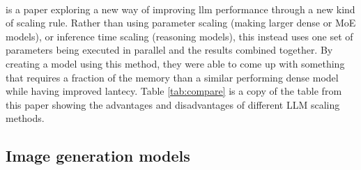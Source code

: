 \paragraph{}\autocite{chen_parallel_2025} is a paper exploring a new way of improving \acrshort{llm} performance through a new kind of scaling rule. Rather than using parameter scaling (making larger dense or MoE models), or inference time scaling (reasoning models), this instead uses one set of parameters being executed in parallel and the results combined together. By creating a model using this method, they were able to come up with something that requires a fraction of the memory than a similar performing dense model while having improved lantecy. Table \ref{tab:compare} is a copy of the table from this paper showing the advantages and disadvantages of different LLM scaling methods.



{
\begin{table}[t]
\caption{Copy of comparison table from \textcite{chen_parallel_2025}}
\centering
{}
\label{tab:compare}
\end{table}
}

\subsection{Image generation models}
\paragraph{}

